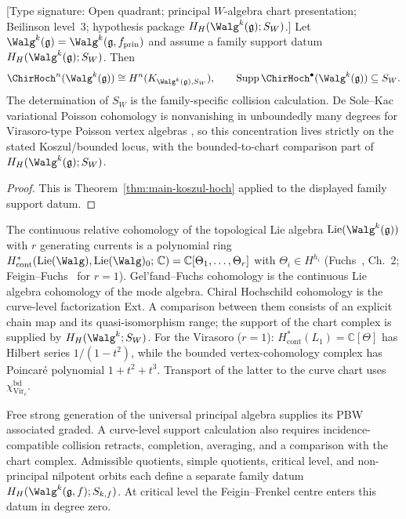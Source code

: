 \begin{theorem}\label{thm:w-algebra-hochschild}
\textup{[Type signature: Open quadrant; principal $W$-algebra chart
presentation; Beilinson level~$3$; hypothesis package
$H_H(\Walg^k(\mathfrak g);S_W)$.]}
Let
\(\Walg^k(\mathfrak g)=\Walg^k(\mathfrak g,f_{\mathrm{prin}})\)
and assume a family support datum
\(H_H(\Walg^k(\mathfrak g);S_W)\).  Then
\[
 \ChirHoch^n(\Walg^k(\mathfrak g))
 \cong H^n(K_{\Walg^k(\mathfrak g),S_W}),
 \qquad
 \operatorname{Supp}\ChirHoch^\bullet(\Walg^k(\mathfrak g))
 \subseteq S_W.
\]
The determination of $S_W$ is the family-specific collision
calculation.  De Sole--Kac variational Poisson cohomology is
nonvanishing in unboundedly many degrees for Virasoro-type Poisson
vertex algebras \cite{BDSK21}, so this concentration lives strictly
on the stated Koszul/bounded locus, with the bounded-to-chart
comparison part of \(H_H(\Walg^k(\mathfrak g);S_W)\).
\end{theorem}

\begin{proof}
This is Theorem~\ref{thm:main-koszul-hoch} applied to the displayed
family support datum.
\end{proof}

\begin{remark}
\label{rem:gf-walg-vs-chirhoch}
The continuous relative cohomology of the topological Lie algebra
$\mathrm{Lie}(\Walg^k(\mathfrak{g}))$ with $r$ generating currents is a
polynomial ring
$H^*_{\mathrm{cont}}(\mathrm{Lie}(\Walg),
\mathrm{Lie}(\Walg)_0;\, \mathbb{C})
= \mathbb{C}[\Theta_1, \ldots, \Theta_r]$
with $\Theta_i \in H^{h_i}$
(Fuchs~\cite{Fuks86}, Ch.~2; Feigin--Fuchs~\cite{FF84} for $r = 1$).
Gel'fand--Fuchs cohomology is the continuous Lie algebra cohomology of
the mode algebra.  Chiral Hochschild cohomology is the curve-level
factorization Ext.  A comparison between them consists of an explicit
chain map and its quasi-isomorphism range; the support of the chart
complex is supplied by $H_H(\Walg^k;S_W)$.
For the Virasoro ($r = 1$): $H^*_{\mathrm{cont}}(L_1) = \mathbb{C}[\Theta]$
has Hilbert series $1/(1-t^2)$, while the bounded vertex-cohomology
complex has Poincar\'e polynomial $1+t^2+t^3$.  Transport of the latter
to the curve chart uses $\chi_{\operatorname{Vir}_c}^{\mathrm{bd}}$.
\end{remark}

\begin{remark}[Scope]
Free strong generation of the universal principal algebra supplies
its PBW associated graded.  A curve-level support calculation also
requires incidence-compatible collision retracts, completion,
averaging, and a comparison with the chart complex.  Admissible
quotients, simple quotients, critical level, and non-principal
nilpotent orbits each define a separate family datum
$H_H(\Walg^k(\mathfrak g,f);S_{k,f})$.  At critical level the
Feigin--Frenkel centre enters this datum in degree zero.
\end{remark}

